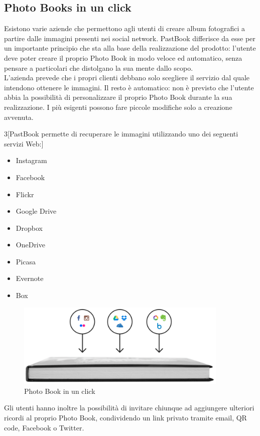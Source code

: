 		\subsection{Photo Books in un click}
			Esistono varie aziende che permettono agli utenti di creare album fotografici a partire dalle immagini presenti nei social
			network. PastBook differisce da esse per un importante principio che sta alla base della realizzazione del prodotto: l'utente
			deve poter creare il proprio Photo Book in modo veloce ed automatico, senza pensare a particolari che distolgano la sua mente
			dallo scopo.\\
			L'azienda prevede che i propri clienti debbano solo scegliere il servizio dal quale intendono ottenere le immagini. Il resto
			è automatico: non è previsto che l'utente abbia la possibilità di personalizzare il proprio Photo Book durante la sua
			realizzazione. I più esigenti possono fare piccole modifiche solo a creazione avvenuta.\\
			\begin{multicols}{3}[\noindent PastBook permette di recuperare le immagini utilizzando uno dei seguenti servizi Web:]
				\begin{itemize}
					\item Instagram
					\item Facebook
					\item Flickr
					\item Google Drive
					\item Dropbox
					\item OneDrive
					\item Picasa
					\item Evernote
					\item Box
				\end{itemize}
			\end{multicols}
			\begin{figure}[H]
				\centering
				\includegraphics[width=0.9\textwidth]{capitolo_1/immagini/photo_book_one_click.png}
				\caption[Photo Book in un click]{Photo Book in un click\protect\footnotemark}
			\end{figure}
			\noindent Gli utenti hanno inoltre la possibilità di invitare chiunque ad aggiungere ulteriori ricordi al proprio Photo Book,
			condividendo un link privato tramite email, QR code, Facebook o Twitter.
